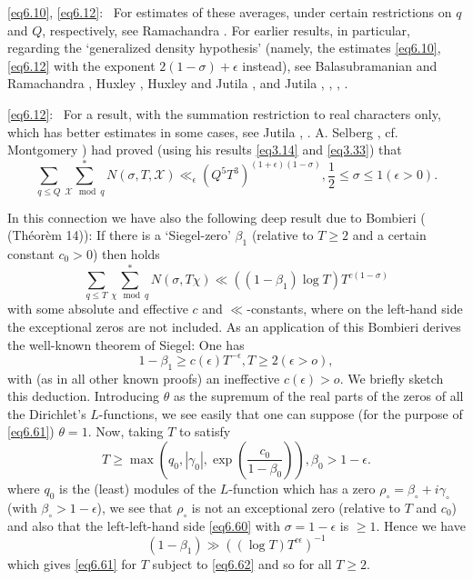\begin{enumerate}[{\bf 1.:}]
\eqref{eq6.10}, \eqref{eq6.12}:~ For estimates of these averages,
under certain restrictions on $q$ and $Q$, respectively, see
Ramachandra \cite{key4}. For earlier results, in particular, regarding the
`generalized density hypothesis' (namely, the estimates
\eqref{eq6.10}, \eqref{eq6.12} with the exponent $2(1-\sigma) + \epsilon$
 instead), see 
Balasubramanian and Ramachandra \cite{key1}, Huxley \cite{key9},
Huxley and Jutila \cite{key1}, and Jutila \cite{key5}, \cite{key9},
\cite{key10}, \cite{key11}.   

\eqref{eq6.12}:~ For a result, with the summation restriction to real
characters only, which has better estimates in some cases, see Jutila
\cite{key4}, \cite{key6}. A. Selberg \cite{key6},
cf. Montgomery\pageoriginale 
\cite{key8}) had proved (using his results \eqref{eq3.14} and
\eqref{eq3.33}) that  
\begin{equation*}
\sum_{q\leq Q} \sum_{\mathcal{X} \mod q}^* N(\sigma , T, \mathcal{X})
\ll_{\epsilon} (Q^5 T^3)^{(1 + \epsilon)(1 -\sigma)}, \frac{1}{2} \leq \sigma
\leq 1 (\epsilon > 0). \tag{6.59}\label{eq6.59} 
\end{equation*}

In this connection we have also the following deep result due to
Bombieri (\cite{key6} (Th\'eor\`em 14)): If there is a `Siegel-zero' $\beta_1$
(relative to $T \geq 2$ and a certain constant $c_0 > 0$) then holds 
\begin{equation*}
\sum _{q \leq T} \sum _{\chi \mod q}^* N(\sigma, T \chi)
\ll ((1-\beta_1 )\log T)T^{c(1-\sigma )} \tag{6.60}\label{eq6.60} 
\end{equation*}
with some absolute and effective $c$ and $\ll$-constants, where on the
left-hand side the exceptional zeros are not included. As an
application of this Bombieri \cite{key6} derives the well-known theorem of
Siegel: One has 
\begin{equation*}
1-\beta _1 \geq c (\epsilon )T^{-\epsilon}, T \geq 2 (\epsilon > o),
\tag{6.61}\label{eq6.61} 
\end{equation*}
with (as in all other known proofs) an ineffective $c(\epsilon) > o$. We
briefly sketch this deduction. Introducing $\theta$ as the supremum of
the real parts of the zeros of all the Dirichlet's $L$-functions, we see
easily that one can suppose (for the purpose of \eqref{eq6.61}) $\theta
=1$. Now, taking $T$ to satisfy 
\begin{equation*}
T \geq \max (q_0, |\gamma _0|, \exp (\frac{c_0}{1-\beta_0})), \beta_0
>1-\epsilon . \tag{6.62}\label{eq6.62} 
 \end{equation*}
 where $q_0$ is the (least) modules of the $L$-function which has a zero
 $\rho _\circ = \beta_\circ + i \gamma _\circ$ (with $\beta_\circ > 1-
 \epsilon$), we 
 see that $\rho_\circ$ is not an exceptional zero (relative to $T$
 and $c_0$) and also that the left-left-hand side \eqref{eq6.60} with
 $\sigma = 1 - \epsilon $ is $\geq 1$. Hence we have  
 \begin{equation*}
(1-\beta_1) \gg ((\log T)T^{c \epsilon})^{-1} \tag{6.63}\label{eq6.63}
 \end{equation*}
which gives \eqref{eq6.61} for $T$ subject to \eqref{eq6.62} and so
for all $T \geq 2$. 


\end{enumerate}
